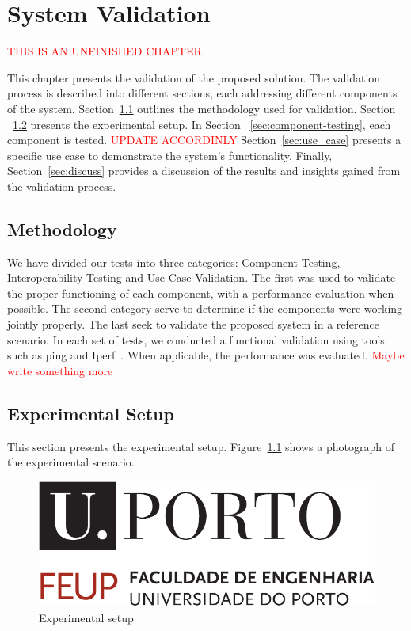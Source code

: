 \chapter{System Validation}\label{ch:validation}

\textcolor{red}{THIS IS AN UNFINISHED CHAPTER}

This chapter presents the validation of the proposed solution.
The validation process is described into different sections, each addressing different components of the system.
Section~\ref{sec:meth} outlines the methodology used for validation.
Section ~\ref{sec:experimental-setup} presents the experimental setup.
In Section ~\ref{sec:component-testing}, each component is tested.
\textcolor{red}{UPDATE ACCORDINLY}
Section~\ref{sec:use_case} presents a specific use case to demonstrate the system's functionality.
Finally, Section~\ref{sec:discuss} provides a discussion of the results and insights gained from the validation process.

\section{Methodology}\label{sec:meth}
We have divided our tests into three categories: Component Testing, Interoperability Testing and Use Case Validation.
The first was used to validate the proper functioning of each component, with a performance evaluation when possible.
The second category serve to determine if the components were working jointly properly.
The last seek to validate the proposed system in a reference scenario.
In each set of tests, we conducted a functional validation using tools such as ping and Iperf~\cite{iperf}.
When applicable, the performance was evaluated.
\textcolor{red}{Maybe write something more}

\section{Experimental Setup}\label{sec:experimental-setup}
This section presents the experimental setup.
Figure~\ref{fig:setup} shows a photograph of the experimental scenario.

\begin{figure}[H]
    \centering
    \includegraphics[width=0.5\linewidth]{figures/uporto-feup}
    \caption{Experimental setup}
    \label{fig:setup}
\end{figure}


